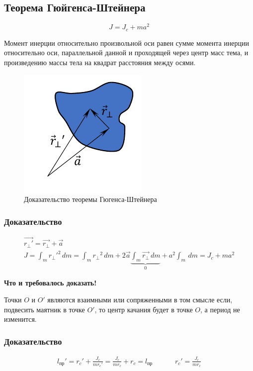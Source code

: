 \subsection{Теорема Гюйгенса-Штейнера}
\[\boxed{J = J_c + ma^2}\]
\begin{center}
	Момент инерции относительно произвольной оси равен сумме момента инерции относительно оси, параллельной данной и проходящей через центр масс тема, и произведению массы тела на квадрат расстояния между осями.
\end{center}
\begin{figure}[H]
	\centering
	\includegraphics[width=0.5\linewidth]{"image/Теорема Гюгенса-Штейнера"}
	\caption{Доказательство теоремы Гюгенса-Штейнера}
	\label{fig:1}
\end{figure}

\subsubsection*{Доказательство}
\vspace{-2em}
\begin{gather*}
	\vec{r_{\perp}'} = \vec{r_\perp} + \vec{a}\\
	J = \int_m {r_{\perp}'}^2 \, dm = \int_m {r_\perp}^2 \, dm + 2 \vec{a} \underbrace{\int_m \vec{r_\perp} \, dm}_{0} + a^2 \int_m \, dm = \boxed{J_c + ma^2}
\end{gather*}
\begin{center}
	\textbf{Что и требовалось доказать!}
\end{center}

Точки $O$ и $O'$ являются взаимными или сопряженными в том смысле если, подвесить маятник в точке $O'$, то центр качания будет в точке $O$, а период не изменится.

\subsubsection*{Доказательство}
\[\begin{aligned}
	l_{\text{пр}}' = r_c' + \frac{J_c}{m r_c'} = \frac{J_c}{mr_c} + r_c = l_{\text{пр}}  &&&& r_c' = \frac{J_c}{mr_c}
\end{aligned}\]
